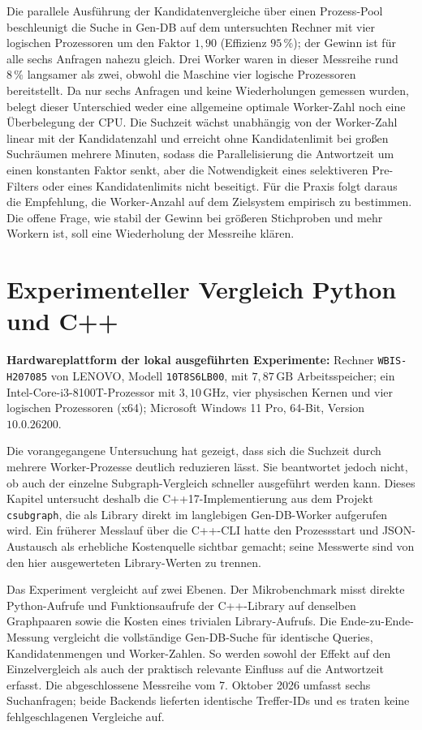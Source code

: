 \documentclass[a4paper,12pt, twoside]{report}
\newcommand{\experimenthardware}{%
	\par\smallskip\noindent
	\textbf{Hardwareplattform der lokal ausgeführten Experimente:} Rechner \texttt{WBIS-H207085} von LENOVO, Modell \texttt{10T8S6LB00}, mit $7{,}87\,\mathrm{GB}$ Arbeitsspeicher; ein Intel-Core-i3-8100T-Prozessor mit $3{,}10\,\mathrm{GHz}$, vier physischen Kernen und vier logischen Prozessoren (x64); Microsoft Windows 11 Pro, 64-Bit, Version $10.0.26200$.
	\par\smallskip}
\theoremstyle{definition}
\begin{document}
Die parallele Ausführung der Kandidatenvergleiche über einen Prozess-Pool beschleunigt die Suche in Gen-DB auf dem untersuchten Rechner mit vier logischen Prozessoren um den Faktor $1{,}90$ (Effizienz $95\,\%$); der Gewinn ist für alle sechs Anfragen nahezu gleich. Drei Worker waren in dieser Messreihe rund $8\,\%$ langsamer als zwei, obwohl die Maschine vier logische Prozessoren bereitstellt. Da nur sechs Anfragen und keine Wiederholungen gemessen wurden, belegt dieser Unterschied weder eine allgemeine optimale Worker-Zahl noch eine Überbelegung der CPU. Die Suchzeit wächst unabhängig von der Worker-Zahl linear mit der Kandidatenzahl und erreicht ohne Kandidatenlimit bei großen Suchräumen mehrere Minuten, sodass die Parallelisierung die Antwortzeit um einen konstanten Faktor senkt, aber die Notwendigkeit eines selektiveren Pre-Filters oder eines Kandidatenlimits nicht beseitigt. Für die Praxis folgt daraus die Empfehlung, die Worker-Anzahl auf dem Zielsystem empirisch zu bestimmen. Die offene Frage, wie stabil der Gewinn bei größeren Stichproben und mehr Workern ist, soll eine Wiederholung der Messreihe klären.

\chapter{Experimenteller Vergleich Python und C++}
\label{sec:backends}

\experimenthardware

Die vorangegangene Untersuchung hat gezeigt, dass sich die Suchzeit durch mehrere Worker-Prozesse deutlich reduzieren lässt. Sie beantwortet jedoch nicht, ob auch der einzelne Subgraph-Vergleich schneller ausgeführt werden kann. Dieses Kapitel untersucht deshalb die C++17-Implementierung aus dem Projekt \texttt{csubgraph}, die als Library direkt im langlebigen Gen-DB-Worker aufgerufen wird. Ein früherer Messlauf über die C++-CLI hatte den Prozessstart und JSON-Austausch als erhebliche Kostenquelle sichtbar gemacht; seine Messwerte sind von den hier ausgewerteten Library-Werten zu trennen.

Das Experiment vergleicht auf zwei Ebenen. Der Mikrobenchmark misst direkte Python-Aufrufe und Funktionsaufrufe der C++-Library auf denselben Graphpaaren sowie die Kosten eines trivialen Library-Aufrufs. Die Ende-zu-Ende-Messung vergleicht die vollständige Gen-DB-Suche für identische Queries, Kandidatenmengen und Worker-Zahlen. So werden sowohl der Effekt auf den Einzelvergleich als auch der praktisch relevante Einfluss auf die Antwortzeit erfasst. Die abgeschlossene Messreihe vom 7. Oktober 2026 umfasst sechs Suchanfragen; beide Backends lieferten identische Treffer-IDs und es traten keine fehlgeschlagenen Vergleiche auf.
\end{document}
